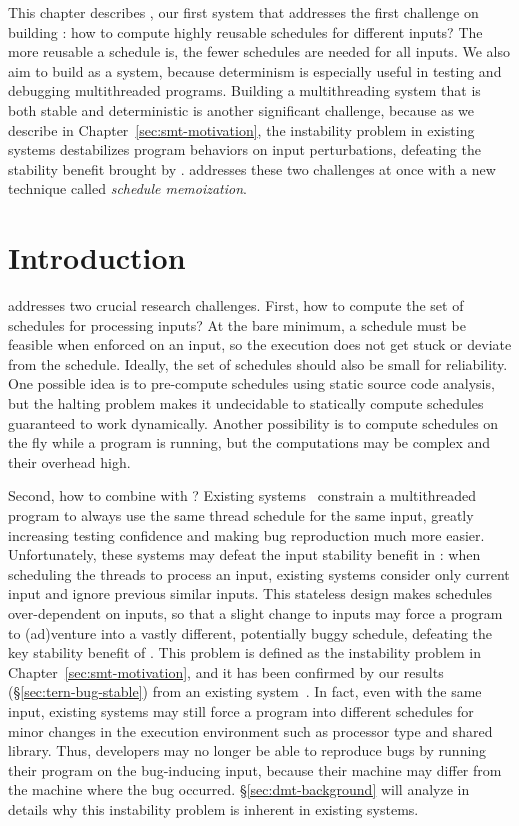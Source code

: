 This chapter describes \tern, our first \smt system that
addresses the first challenge on building \smt: how to compute highly reusable
schedules for different inputs? The more reusable a schedule is, the fewer
schedules are needed for all inputs. We also aim to build \tern as a \dmt 
system, because determinism is especially useful in testing and debugging 
multithreaded programs. Building a multithreading system that is both stable 
and deterministic is another significant challenge, because as we describe in 
Chapter~\ref{sec:smt-motivation}, the instability problem in existing \dmt 
systems destabilizes program behaviors on input perturbations,
defeating the stability benefit brought by \smt. \tern addresses these two 
challenges at once with a new technique called \emph{schedule memoization}.


\section{Introduction} \label{sec:tern-overview}

\tern addresses two crucial research challenges. First, how to compute the set
of schedules for processing inputs?  At the bare minimum, a schedule must be
feasible when enforced on an input, so the execution does not get stuck or
deviate from the schedule.  Ideally, the set of schedules should also be small
for reliability.  One possible idea is to pre-compute schedules using static
source code analysis, but the halting problem makes it undecidable to
statically compute schedules guaranteed to work dynamically.  Another
possibility is to compute schedules on the fly while a program is running,
but the computations may be complex and their overhead high.

Second, how to combine \dmt with \smt? Existing \dmt
systems~\cite{dmp:asplos09,coredet:asplos10,kendo:asplos09} constrain a
multithreaded program to always use the same thread schedule for the same input,
greatly increasing testing confidence and making bug reproduction much more
easier. Unfortunately, these \dmt systems may defeat the input stability
benefit in \smt: when scheduling the threads to process an
input, existing \dmt systems consider only current input and ignore previous
similar inputs.  This stateless design makes schedules over-dependent on inputs,
so that a slight change to inputs may force a program to (ad)venture into a
vastly different, potentially buggy schedule, defeating the key stability
benefit of \smt.  This problem is defined as the instability problem in 
Chapter~\ref{sec:smt-motivation}, and it has been
confirmed by our results (\S\ref{sec:tern-bug-stable}) from an existing \dmt
system~\cite{coredet:asplos10}. In fact, even with the same 
input, existing \dmt systems may still force a program into different schedules 
for minor changes in the execution environment such as processor type and 
shared library.  Thus, developers may no longer be able to reproduce bugs by 
running their program on the bug-inducing input, because their machine may 
differ from the machine where the bug occurred. \S\ref{sec:dmt-background} will 
analyze in details why this instability problem is inherent in existing \dmt 
systems.

